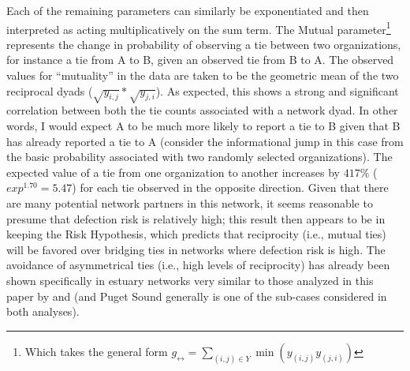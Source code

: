 \documentclass[12pt,a4paper,titlepage]{article}
\begin{document}
\singlespacing

\doublespacing

Each of the remaining parameters can similarly be exponentiated and then interpreted as acting multiplicatively on the sum term. The Mutual parameter\footnote{Which takes the general form $g_{\leftrightarrow} = \sum_{(i,j) \in Y} \min{( y_{(i,j)} y_{(j,i)})}$} represents the change in probability of observing a tie between two organizations, for instance a tie from A to B, given an observed tie from B to A. The observed values for “mutuality” in the data are taken to be the geometric mean of the two reciprocal dyads ($\sqrt{y_{i,j}} * \sqrt{y_{j,i}}$). As expected, this shows a strong and significant correlation between both the tie counts associated with a network dyad. In other words, I would expect A to be much more likely to report a tie to B given that B has already reported a tie to A (consider the informational jump in this case from the basic probability associated with two randomly selected organizations). The expected value of a tie from one organization to another increases by $417\%$ ($exp^{1.70} = 5.47$) for each tie observed in the opposite direction. Given that there are many potential network partners in this network, it seems reasonable to presume that defection risk is relatively high; this result then appears to be in keeping the \textcite{berardo2010} Risk Hypothesis, which predicts that reciprocity (i.e., mutual ties) will be favored over bridging ties in networks where defection risk is high. The avoidance of asymmetrical ties (i.e., high levels of reciprocity) has already been shown specifically in estuary networks very similar to those analyzed in this paper by \textcite{berardo2010} and \textcite{desmarais2012} (and Puget Sound generally is one of the sub-cases considered in both analyses).  
\end{document}
